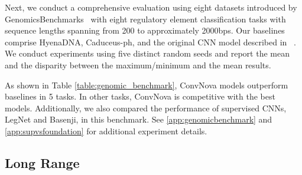 Next, we conduct a comprehensive evaluation using eight datasets introduced by GenomicsBenchmarks~\citep{grevsova2023genomic} with eight regulatory element classification tasks with sequence lengths spanning from 200 to approximately 2000bps. Our baselines comprise HyenaDNA, Caduceus-ph, and the original CNN model described in ~\citep{grevsova2023genomic}. We conduct experiments using five distinct random seeds and report the mean and the disparity between the maximum/minimum and the mean results.
 
As shown in Table \ref{table:genomic_benchmark}, ConvNova models outperform baselines in 5 tasks. In other tasks, ConvNova is competitive with the best models. Additionally, we also compared the performance of supervised CNNs, LegNet and Basenji, in this benchmark. See \ref{app:genomicbenchmark} and \ref{app:supvsfoundation} for additional experiment details.


\subsection{Long Range}

